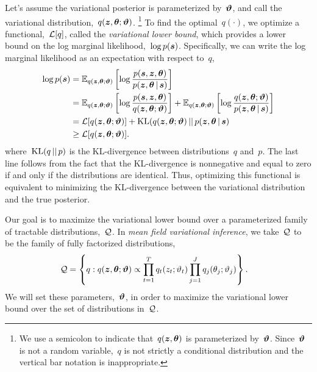 Let's assume the variational posterior is parameterized by~$\boldsymbol{\vartheta}$,
and call the variational distribution,~$q(\boldsymbol{z}, \boldsymbol{\theta} ; \boldsymbol{\vartheta})$.
\footnote{We use a semicolon to indicate that~$q(\boldsymbol{z}, \boldsymbol{\theta})$ is
  parameterized by~$\boldsymbol{\vartheta}$.  Since~$\boldsymbol{\vartheta}$ is not a random
  variable,~$q$ is not strictly a conditional distribution and the
  vertical bar notation is inappropriate.}  To find the
optimal~$q(\cdot)$, we optimize a functional,~$\mathcal{L}[q]$, called the
\emph{variational lower bound}, which provides a lower bound on the
log marginal likelihood,~${\log p(\boldsymbol{s})}$.  Specifically, we can write
the log marginal likelihood as an expectation with respect to~$q$,
\begin{align*}
  \log p(\boldsymbol{s}) 
  &= \mathbb{E}_{q(\boldsymbol{z}, \boldsymbol{\theta} ; \boldsymbol{\vartheta})} \left[ \log \frac{p(\boldsymbol{s}, \boldsymbol{z}, \boldsymbol{\theta})}{p(\boldsymbol{z}, \boldsymbol{\theta} \,|\, \boldsymbol{s})} \right] \\
  &= \mathbb{E}_{q(\boldsymbol{z}, \boldsymbol{\theta} ; \boldsymbol{\vartheta})} \left[ \log \frac{p(\boldsymbol{s}, \boldsymbol{z}, \boldsymbol{\theta})}{q(\boldsymbol{z}, \boldsymbol{\theta}; \boldsymbol{\vartheta})} \right]
   + \mathbb{E}_{q(\boldsymbol{z}, \boldsymbol{\theta}; \boldsymbol{\vartheta})} \left[ \log \frac{q(\boldsymbol{z}, \boldsymbol{\theta}; \boldsymbol{\vartheta})}{p(\boldsymbol{z}, \boldsymbol{\theta} \,|\, \boldsymbol{s})} \right] \\
  &= \mathcal{L}[q(\boldsymbol{z}, \boldsymbol{\theta}; \boldsymbol{\vartheta})] + \mathrm{KL}(q(\boldsymbol{z}, \boldsymbol{\theta}; \boldsymbol{\vartheta}) {\,||\,} p(\boldsymbol{z}, \boldsymbol{\theta} \,|\, \boldsymbol{s}) \\
  &\geq \mathcal{L}[q(\boldsymbol{z}, \boldsymbol{\theta}; \boldsymbol{\vartheta})].
\end{align*}
where~$\mathrm{KL}(q {\,||\,} p)$ is the KL-divergence between distributions~$q$ and~$p$. 
The last line follows from the fact that the KL-divergence is nonnegative
and equal to zero if and only if the distributions are identical. Thus, 
optimizing this functional is equivalent to minimizing the KL-divergence
between the variational distribution and the true posterior.

Our goal is to maximize the variational lower bound over a
parameterized family of tractable distributions,~$\mathcal{Q}$. In \emph{mean field
variational inference}, we take~$\mathcal{Q}$ to be the family of fully
factorized distributions,
\begin{align*}
  \mathcal{Q} &= \left \{ q: q(\boldsymbol{z}, \boldsymbol{\theta}; \boldsymbol{\vartheta}) \propto \prod_{t=1}^T q_t(z_t; \vartheta_t) \prod_{j=1}^J q_j(\theta_j; \vartheta_j) \right\}.
\end{align*}
We will set these parameters,~$\boldsymbol{\vartheta}$, in order to maximize the
variational lower bound over the set of distributions in~$\mathcal{Q}$.

